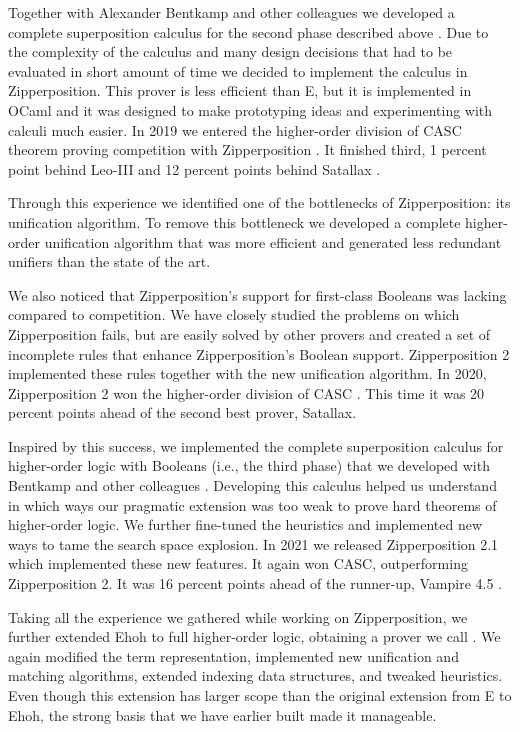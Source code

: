   Together with Alexander Bentkamp and other colleagues we developed
  a complete superposition calculus for the second phase described above
  \cite{bbtvw-21-sup-lam}. Due to the complexity of the calculus and many design
  decisions that had to be evaluated in short amount of time we decided to
  implement the calculus in Zipperposition. This prover is less efficient than
  E, but it is implemented in OCaml and it was designed to make prototyping
  ideas and experimenting with calculi much easier. In 2019 we entered the
  higher-order division of CASC theorem proving competition with Zipperposition
  \cite{gs-19-casc27}. It finished third, 1 percent point behind Leo-III
  \cite{sb-21-leo3}  and 12 percent points behind  Satallax
  \cite{cb-12-satallax}.
  
  Through this experience we identified one of the bottlenecks of
  Zipperposition: its unification algorithm. To remove this bottleneck we
  developed a complete higher-order unification algorithm that was more
  efficient and generated less redundant unifiers than the state of the art. 
  
  We also noticed that Zipperposition's support for first-class Booleans
  was lacking compared to competition. We have closely studied the problems on
  which Zipperposition fails, but are easily solved by other provers and created
  a set of incomplete rules that enhance Zipperposition's Boolean support.
  Zipperposition 2 implemented these rules together with the new unification
  algorithm. In 2020, Zipperposition 2 won the higher-order division
  of CASC \cite{gs-21-cascj10}. This time it was 20 percent points ahead of the second best
  prover, Satallax.
  
  Inspired by this success, we implemented the complete superposition
  calculus for higher-order logic with Booleans (i.e., the third phase) that we developed with Bentkamp and other
  colleagues \cite{bbtv-21-full-ho-sup}. Developing this calculus helped us understand in which
  ways our pragmatic extension was too weak to prove hard theorems of
  higher-order logic. We further fine-tuned the heuristics and implemented new ways
  to tame the search space explosion. In 2021 we released Zipperposition 2.1
  which implemented these new features. It again won
  CASC, outperforming Zipperposition 2. It was 16 percent points ahead of the
  runner-up, Vampire 4.5 \cite{lkav-13-vampire}. 
  
  Taking all the experience we gathered while working on Zipperposition,
  we further extended Ehoh to full higher-order logic, obtaining a prover we call
  \newehoh{}. We again modified the term representation, implemented new unification and
  matching algorithms, extended indexing data structures, and tweaked
  heuristics. Even though this extension has larger scope than the original
  extension from E to Ehoh, the strong basis that we have earlier built made it
  manageable.

